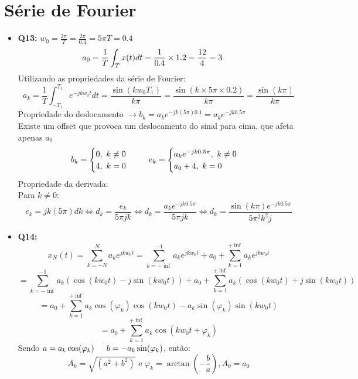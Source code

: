 \documentclass[a4paper, 12pt]{article}
\begin{document}
\section{Série de Fourier}
\begin{itemize}
    \item \textbf{Q13:} $w_0 = \frac{2\pi}{T} = \frac{2\pi}{0.4} = 5\pi$\hspace{50px}$T = 0.4$
          \[a_0 = \frac{1}{T}\int_{T}x(t)dt = \frac{1}{0.4} \times 1.2 = \frac{12}{4} = 3\hspace{15px} \vspace{10px}\]
          Utilizando as propriedades da série de Fourier:\vspace{10px}
          \[a_k = \frac{1}{T}\int_{-T_1}^{T_1}e^{-jkw_{0}t}dt = \frac{\sin(kw_{0}T_1)}{k\pi} = \frac{\sin(k \times 5\pi \times 0.2)}{k\pi} = \frac{\sin(k\pi)}{k\pi}\]
          Propriedade do deslocamento $\to b_k = a_{k}e^{-jk(5\pi)0.1} = a_{k}e^{-jk0.5\pi}$\\
          Existe um offset que provoca um deslocamento do sinal para cima, que afeta apenas $a_0$
          \[b_k =
              \begin{cases}
                  0, \textrm{ }k\neq0 \\
                  4, \textrm{ }k = 0
              \end{cases}
              \hspace{15px}
              e_k =
              \begin{cases}
                  a_{k}e^{-jk0.5\pi}, \textrm{ }k\neq0 \\
                  a_{0} + 4, \textrm{ }k = 0
              \end{cases}\]
          Propriedade da derivada:\vspace{10px}\\
          Para $k\neq0$:
          \[e_k = jk(5\pi)dk \Leftrightarrow d_k = \frac{e_k}{5\pi jk} \Leftrightarrow d_k = \frac{a_{k}e^{-jk0.5\pi}}{5\pi jk} \Leftrightarrow d_k = \frac{\sin(k\pi)e^{-jk0.5\pi}}{5\pi^{2}k^{2}j}\]
    \item \textbf{Q14:} \[x_N(t) = \sum_{k = -N}^{N} a_{k}e^{jkw_{0}t} = \sum_{k = -\inf}^{-1}a_{k}e^{jkw_{0}t} + a_{0} + \sum_{k=1}^{+\inf}a_{k}e^{jkw_{0}t}\]
          \[= \sum_{k = -\inf}^{-1}a_{k}(\cos(kw_{0}t) - j\sin(kw_{0}t)) + a_{0} + \sum_{k = 1}^{+\inf}a_{k}(\cos(kw_{0}t) + j\sin(kw_{0}t))\]
          \[= a_{0} + \sum_{k=1}^{+\inf}a_{k}\cos(\varphi_{k})\cos(kw_{0}t) - a_{k}\sin(\varphi_{k})\sin(kw_{0}t)\]
          \[= a_{0} + \sum_{k=1}^{+\inf}a_{k}\cos(kw_{0}t + \varphi_{k})\]
          Sendo $a = a_{k}\cos(\varphi_k)\hspace{15px}b=-a_k\sin(\varphi_{k})$, então:
          \[A_{k} = \sqrt{(a^{2}+b^{2})} \textrm{ e } \varphi_{k} = \arctan(-\frac{b}{a}), A_0 = a_0\]
\end{itemize}
\newpage
\end{document}
